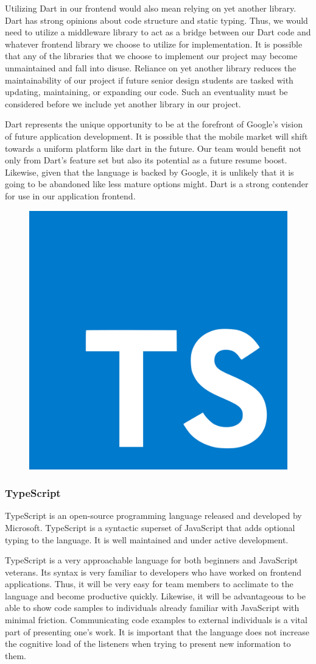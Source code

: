 \documentclass[12pt]{report}
\begin{document}
Utilizing Dart in our frontend would also mean relying on yet another library. Dart has strong opinions about code structure and static typing. Thus, we would need to utilize a middleware library to act as a bridge between our Dart code and whatever frontend library we choose to utilize for implementation. It is possible that any of the libraries that we choose to implement our project may become unmaintained and fall into disuse. Reliance on yet another library reduces the maintainability of our project if future senior design students are tasked with updating, maintaining, or expanding our code. Such an eventuality must be considered before we include yet another library in our project.

Dart represents the unique opportunity to be at the forefront of Google's vision of future application development. It is possible that the mobile market will shift towards a uniform platform like dart in the future. Our team would benefit not only from Dart's feature set but also its potential as a future resume boost. Likewise, given that the language is backed by Google, it is unlikely that it is going to be abandoned like less mature options might. Dart is a strong contender for use in our application frontend.

\begin{figure}[h]
	\centering
	\includegraphics[width=0.25\linewidth]{typescript}
\end{figure}

\subsubsection*{TypeScript}

TypeScript is an open-source programming language released and developed by Microsoft. TypeScript is a syntactic superset of JavaScript that adds optional typing to the language.\cite{typescripthomepage} It is well maintained and under active development.

TypeScript is a very approachable language for both beginners and JavaScript veterans. Its syntax is very familiar to developers who have worked on frontend applications. Thus, it will be very easy for team members to acclimate to the language and become productive quickly. Likewise, it will be advantageous to be able to show code samples to individuals already familiar with JavaScript with minimal friction. Communicating code examples to external individuals is a vital part of presenting one's work. It is important that the language does not increase the cognitive load of the listeners when trying to present new information to them.
\end{document}
